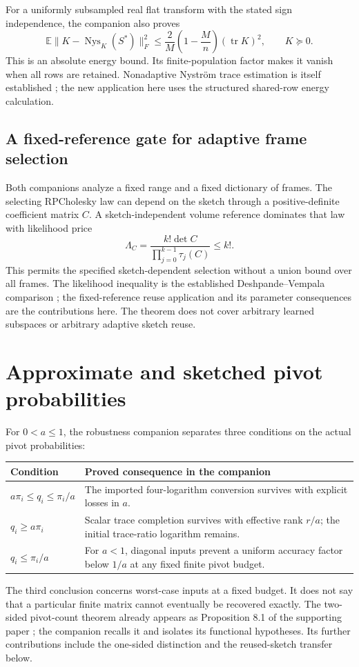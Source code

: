 \documentclass[11pt,a4paper]{article}
\newcommand{\E}{\mathbb E}
\newcommand{\tr}{\operatorname{tr}}
\newcommand{\norm}[1]{\lVert#1\rVert}
\begin{document}
For a uniformly subsampled real flat transform with the stated sign
independence, the companion also proves
\[
 \E\norm{K-\operatorname{Nys}_K(S^*)}_F^2
 \le\frac2M\left(1-\frac Mn\right)(\tr K)^2,
 \qquad K\succeq0.
\]
This is an absolute energy bound. Its finite-population factor makes it
vanish when all rows are retained. Nonadaptive Nystr\"om trace estimation
is itself established \cite{Nyspp}; the new application here uses the
structured shared-row energy calculation.

\subsection{A fixed-reference gate for adaptive frame selection}
Both companions analyze a fixed range and a fixed dictionary of frames.
The selecting RPCholesky law can depend on the sketch through a
positive-definite coefficient matrix $C$. A sketch-independent volume
reference dominates that law with likelihood price
\[
 \Lambda_C=\frac{k!\det C}{\prod_{j=0}^{k-1}\tau_j(C)}\le k!.
\]
This permits the specified sketch-dependent selection without a union bound
over all frames. The likelihood inequality is the established
Deshpande--Vempala comparison \cite{DV}; the fixed-reference reuse
application and its parameter consequences are the contributions here.
The theorem does not cover arbitrary learned subspaces or arbitrary
adaptive sketch reuse.

\section{Approximate and sketched pivot probabilities}
For $0<a\le1$, the robustness companion \cite{Robust} separates three
conditions on the actual pivot probabilities:
\begin{center}
\begin{tabularx}{\textwidth}{@{}p{}X@{}}
\toprule
Condition & Proved consequence in the companion\\
\midrule
$a\pi_i\le q_i\le\pi_i/a$ & The imported four-logarithm conversion survives
with explicit losses in $a$.\\
$q_i\ge a\pi_i$ & Scalar trace completion survives with effective rank
$r/a$; the initial trace-ratio logarithm remains.\\
$q_i\le\pi_i/a$ & For $a<1$, diagonal inputs prevent a uniform accuracy
factor below $1/a$ at any fixed finite pivot budget.\\
\bottomrule
\end{tabularx}
\end{center}
The third conclusion concerns worst-case inputs at a fixed budget. It does
not say that a particular finite matrix cannot eventually be recovered
exactly. The two-sided pivot-count theorem already appears as Proposition
8.1 of the supporting paper \cite{IterLog}; the companion recalls it and
isolates its functional hypotheses. Its further contributions include the
one-sided distinction and the reused-sketch transfer below.
\end{document}
